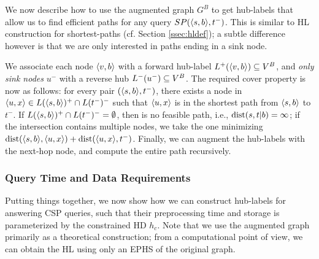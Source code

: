 We now describe how to use the augmented graph $G^B$ to get hub-labels that allow us to find efficient paths for any query $SP(\langle s,b\rangle,t^-)$.
This is similar to HL construction for shortest-paths (cf. Section \ref{ssec:hldef}); a subtle difference however is that we are only interested in paths ending in a sink node.

We associate each node $\langle v,b\rangle$ with a forward hub-label $L^+(\langle v,b\rangle)\subseteq V^B$, and \emph{only sink nodes} $u^-$ with a reverse hub $L^-(u^-)\subseteq V^B$.
The required cover property is now as follows: for every pair $(\langle s,b\rangle,t^-)$, there exists a node in $\langle u,x\rangle\in L(\langle s,b\rangle)^+\cap L(t^-)^-$ such that $\langle u,x\rangle$ is in the shortest path from $\langle s,b\rangle$ to $t^-$.
If $L(\langle s,b\rangle)^+\cap L(t^-)^-=\emptyset$, then is no feasible path, i.e., $\text{dist}(s,t|b)=\infty$; if the intersection contains multiple nodes, we take the one minimizing $\text{dist}(\langle s,b\rangle,\langle u,x\rangle)+\text{dist}(\langle u,x\rangle,t^-)$.
Finally, we can augment the hub-labels with the next-hop node, and compute the entire path recursively.


\subsubsection{Query Time and Data Requirements}
Putting things together, we now show how we can construct hub-labels for answering CSP queries, such that their preprocessing time and storage is parameterized by the constrained HD $h_c$.
Note that we use the augmented graph primarily as a theoretical construction; from a computational point of view, we can obtain the HL using only an EPHS of the original graph.


